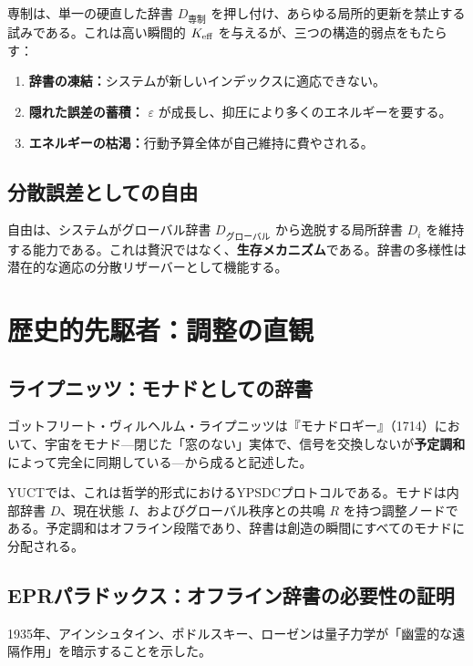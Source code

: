 \documentclass[11pt,a4paper]{article}
\newcommand{\eps}{\varepsilon}
\begin{document}
	専制は、単一の硬直した辞書 \(D_{\text{専制}}\) を押し付け、あらゆる局所的更新を禁止する試みである。これは高い瞬間的 \(\Keff\) を与えるが、三つの構造的弱点をもたらす：
	
	\begin{enumerate}
		\item \textbf{辞書の凍結：}システムが新しいインデックスに適応できない。
		\item \textbf{隠れた誤差の蓄積：} \(\eps\) が成長し、抑圧により多くのエネルギーを要する。
		\item \textbf{エネルギーの枯渇：}行動予算全体が自己維持に費やされる。
	\end{enumerate}
	
	\subsection{分散誤差としての自由}
	
	自由は、システムがグローバル辞書 \(D_{\text{グローバル}}\) から逸脱する局所辞書 \(D_i\) を維持する能力である。これは贅沢ではなく、\textbf{生存メカニズム}である。辞書の多様性は潜在的な適応の分散リザーバーとして機能する。
	
	\section{歴史的先駆者：調整の直観}
	
	\subsection{ライプニッツ：モナドとしての辞書}
	
	ゴットフリート・ヴィルヘルム・ライプニッツは『モナドロギー』（1714）において、宇宙をモナド—閉じた「窓のない」実体で、信号を交換しないが\textbf{予定調和}によって完全に同期している—から成ると記述した。
	
	YUCTでは、これは哲学的形式におけるYPSDCプロトコルである。モナドは内部辞書 \(D\)、現在状態 \(I\)、およびグローバル秩序との共鳴 \(R\) を持つ調整ノードである。予定調和はオフライン段階であり、辞書は創造の瞬間にすべてのモナドに分配される。
	
	\subsection{EPRパラドックス：オフライン辞書の必要性の証明}
	
	1935年、アインシュタイン、ポドルスキー、ローゼンは量子力学が「幽霊的な遠隔作用」を暗示することを示した。
	
\end{document}

